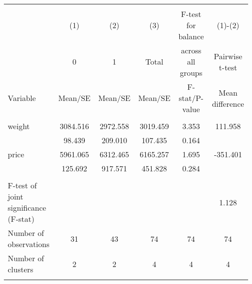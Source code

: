 \begin{tabular}{@{\extracolsep{5pt}}lccccc}
\\[-1.8ex]\hline \hline \\[-1.8ex]
 & \multicolumn{1}{c}{(1)}  & \multicolumn{1}{c}{(2)}  & \multicolumn{1}{c}{(3)}  & \multicolumn{1}{c}{F-test for balance} & \multicolumn{1}{c}{(1)-(2)} \\
 & \multicolumn{1}{c}{0}  & \multicolumn{1}{c}{1}  & \multicolumn{1}{c}{Total}  & \multicolumn{1}{c}{across all groups} & \multicolumn{1}{c}{Pairwise t-test}  \\
Variable & Mean/SE & Mean/SE & Mean/SE & F-stat/P-value & Mean difference \\ \hline \\[-1.8ex] 
weight   &  3084.516    &  2972.558    &  3019.459    &     3.353    &   111.958   \\
 &    98.439  &   209.010  &   107.435  &     0.164  &   \\
price   &  5961.065    &  6312.465    &  6165.257    &     1.695    &  -351.401   \\
 &   125.692  &   917.571  &   451.828  &     0.284  &   \\
\hline \\[-1.8ex]
F-test of joint significance (F-stat) &   &   &   &     &      1.128   \\
Number of observations  & 31   & 43   & 74  & 74 & 74   \\
Number of clusters & 2  & 2  & 4  & 4 & 4   \\
\hline \\[-1.8ex]

\end{tabular}
